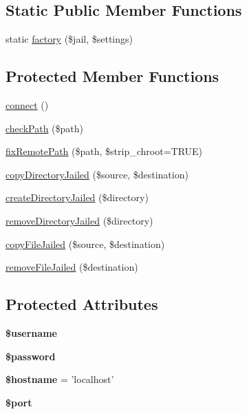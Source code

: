 \subsection*{Static Public Member Functions}
\begin{DoxyCompactItemize}
\item 
static \hyperlink{classFileTransfer_aed740d2f6e0780134b2b29a174ad05f2}{factory} (\$jail, \$settings)
\end{DoxyCompactItemize}
\subsection*{Protected Member Functions}
\begin{DoxyCompactItemize}
\item 
\hyperlink{classFileTransfer_a78b9b9fdd3029295f73a5a41e052e311}{connect} ()
\item 
\hyperlink{classFileTransfer_a1bd7f1c3b5431c3b53236f7aae0c1460}{checkPath} (\$path)
\item 
\hyperlink{classFileTransfer_aeb01984e5d0dfab6959a0ac717578786}{fixRemotePath} (\$path, \$strip\_\-chroot=TRUE)
\item 
\hyperlink{classFileTransfer_a004c3757d055356cbbb99d122a5d686c}{copyDirectoryJailed} (\$source, \$destination)
\item 
\hyperlink{classFileTransfer_a585c6cfab189aabbee70a624a50af975}{createDirectoryJailed} (\$directory)
\item 
\hyperlink{classFileTransfer_a9b9a21556d191235b3a5f85c15878789}{removeDirectoryJailed} (\$directory)
\item 
\hyperlink{classFileTransfer_a9ca65dc0107476d044cf18c0873f4a90}{copyFileJailed} (\$source, \$destination)
\item 
\hyperlink{classFileTransfer_aa699cbea5def346f1d5ce818b0fa7ea7}{removeFileJailed} (\$destination)
\end{DoxyCompactItemize}
\subsection*{Protected Attributes}
\begin{DoxyCompactItemize}
\item 
\hypertarget{classFileTransfer_a92b6ce04b602409c11b03e35b9e6eaae}{
{\bfseries \$username}}
\label{classFileTransfer_a92b6ce04b602409c11b03e35b9e6eaae}

\item 
\hypertarget{classFileTransfer_ad0357585e341207778a3f64257bae48d}{
{\bfseries \$password}}
\label{classFileTransfer_ad0357585e341207778a3f64257bae48d}

\item 
\hypertarget{classFileTransfer_ac527b9faea32dd027fa4c8af52a52bd2}{
{\bfseries \$hostname} = 'localhost'}
\label{classFileTransfer_ac527b9faea32dd027fa4c8af52a52bd2}

\item 
\hypertarget{classFileTransfer_a05cd703bd2e637177736a743efcbbfd8}{
{\bfseries \$port}}
\label{classFileTransfer_a05cd703bd2e637177736a743efcbbfd8}

\end{DoxyCompactItemize}


